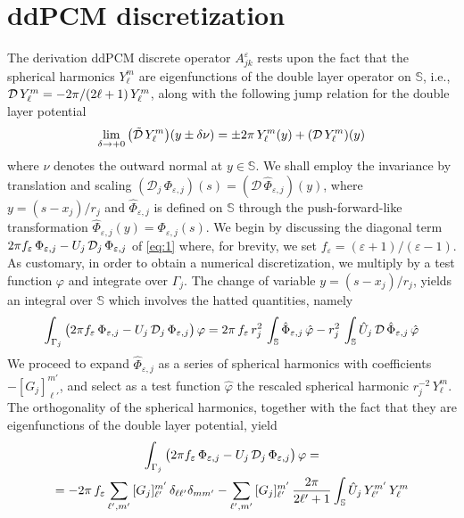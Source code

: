 \section{ddPCM discretization\label{app:mats}}
The derivation ddPCM discrete operator $A^\varepsilon_{jk}$ rests upon the fact that the spherical harmonics $Y_\ell^m$ are eigenfunctions of the double layer operator on $\mathbb{S}$, i.e., $\mathcal{D} \, Y_\ell^m =  -2\pi/ (2\ell+1) \,  Y_\ell^m$, along with the following jump relation for the double layer potential
\begin{equation}\label{eq:jump}
	\lim_{\delta \to + 0} \big(\tilde{\mathcal{D}} \, Y_\ell^m\big)(y \pm \delta \nu) =  \pm 2\pi \, Y_\ell^m(y)+ ( \mathcal{D} \, Y_\ell^m )(y)
\end{equation}
where $\nu$ denotes the outward normal at $y \in \mathbb{S}$. We shall employ the invariance by translation and scaling $(\mathcal{D}_j \, \Phi_{\varepsilon,j})(s) = (\mathcal{D} \, \hat{\Phi}_{\varepsilon,j})(y)$, where $y = (s - x_j)/r_j$ and $\hat{\Phi}_{\varepsilon,j}$ is defined on $\mathbb{S}$ through the push-forward-like transformation $\hat{\Phi}_{\varepsilon,j}(y) = \Phi_{\varepsilon,j}(s)$. We begin by discussing the diagonal term $2\pi f_\varepsilon \, \Phi_{\varepsilon,j} - U_j \, \mathcal{D}_j \, \Phi_{\varepsilon,j}$ of \eqref{eq:1} where, for brevity, we set $f_\varepsilon = (\varepsilon + 1)/(\varepsilon - 1)$. As customary, in order to obtain a numerical discretization, we multiply by a test function $\varphi$ and integrate over $\Gamma_j$.  The change of variable $y = (s- x_j)/r_j$, yields an integral over $\mathbb{S}$ which involves the hatted quantities, namely
\[
\int_{\Gamma_j} \big(2\pi f_\varepsilon \, \Phi_{\varepsilon,j}  - U_j \, \mathcal{D}_j \, \Phi_{\varepsilon,j} \big) \, \varphi = 2 \pi  \, f_\varepsilon \, r_j^2 \,\int_\mathbb{S} \hat{\Phi}_{\varepsilon,j}  \, \hat{\varphi} - r_j^2 \, \int_\mathbb{S} \hat{U}_j \, \mathcal{D} \, \hat{\Phi}_{\varepsilon,j}  \, \hat{\varphi}
\]
We proceed to expand $\hat{\Phi}_{\varepsilon,j}$ as a series of spherical harmonics with coefficients $-[G_j]_{\ell'}^{m'}$, and select as a test function $\hat{\varphi}$  the rescaled spherical harmonic $r_j^{-2} \, Y_{\ell}^{m}$. The orthogonality of the spherical harmonics, together with the fact that they are eigenfunctions of the double layer potential, yield
\begin{multline*}
\int_{\Gamma_j} \big(2\pi f_\varepsilon \, \Phi_{\varepsilon,j}  - U_j \, \mathcal{D}_j \, \Phi_{\varepsilon,j} \big) \, \varphi = \\
= - 2 \pi  \, f_\varepsilon \sum_{\ell',m'}  \, [G_j]_{\ell'}^{m'} \, \delta_{\ell \ell'} \delta_{mm'}  -  \sum_{\ell',m'} \, [G_j]_{\ell'}^{m'} \, \frac{2\pi}{2\ell'+1} \int_{\mathbb{S}} \hat{U}_j \,  Y_{\ell'}^{m'}\, Y_\ell^m
\end{multline*}
